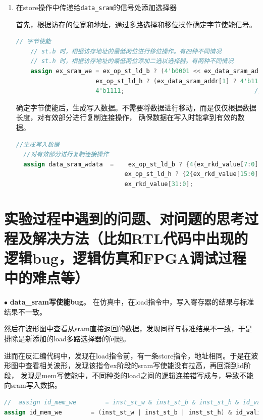 \documentclass[11pt]{article}
\begin{document}
\begin{enumerate}
  \item 在store操作中传递给\verb|data_sram|的信号处添加选择器
  
  首先，根据访存的位宽和地址，通过多路选择和移位操作确定字节使能信号。
  \begin{lstlisting}[language=verilog]
    // 字节使能
    // st.b 时，根据访存地址的最低两位进行移位操作。有四种不同情况
    // st.h 时，根据访存地址的最低两位添加二选以选择器。有两种不同情况
    assign ex_sram_we = ex_op_st_ld_b ? (4'b0001 << ex_data_sram_addr[1:0]) :           // st.b
                      ex_op_st_ld_h ? (ex_data_sram_addr[1] ? 4'b1100 : 4'b0011) :    // st.h
                      4'b1111;                                    // st.w
  \end{lstlisting}
  确定字节使能后，生成写入数据。不需要将数据进行移动，而是仅仅根据数据长度，对有效部分进行复制连接操作，
  确保数据在写入时能拿到有效的数据。
\begin{lstlisting}[language=verilog]
  //生成写入数据
  //对有效部分进行复制连接操作
  assign data_sram_wdata  =    ex_op_st_ld_b ? {4{ex_rkd_value[7:0]}}:
                              ex_op_st_ld_h ? {2{ex_rkd_value[15:0]}}:
                              ex_rkd_value[31:0];
\end{lstlisting}
\end{enumerate}


\vspace{1ex}

\section{实验过程中遇到的问题、对问题的思考过程及解决方法（比如RTL代码中出现的逻辑bug，逻辑仿真和FPGA调试过程中的难点等）}

\noindent
$\bullet$
\textbf{data_sram写使能bug}。
在仿真中，在load指令中，写入寄存器的结果与标准结果不一致。

然后在波形图中查看从sram直接返回的数据，发现同样与标准结果不一致，于是排除是新添加的load多路选择器的问题。

进而在反汇编代码中，发现在load指令前，有一条store指令，地址相同。于是在波形图中查看相关波形，发现该指令ex阶段的sram写使能没有拉高，再回溯到id阶段，
发现是mem写使能中，不同种类的load之间的逻辑连接错写成与，导致不能向sram写入数据。

\begin{lstlisting}[language=verilog]
//  assign id_mem_we        = inst_st_w & inst_st_b & inst_st_h & id_valid;  
assign id_mem_we        = (inst_st_w | inst_st_b | inst_st_h) & id_valid;  
\end{lstlisting}
\vspace{1ex}
\end{document}
